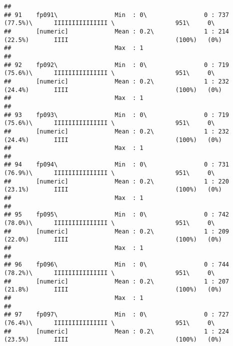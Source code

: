 \documentclass[]{article}
\begin{document}
\begin{verbatim}
## 
## 91    fp091\                Min  : 0\                0 : 737 (77.5%)\      IIIIIIIIIIIIIII \                 951\     0\       
##       [numeric]             Mean : 0.2\              1 : 214 (22.5%)       IIII                              (100%)   (0%)     
##                             Max  : 1                                                                                           
## 
## 92    fp092\                Min  : 0\                0 : 719 (75.6%)\      IIIIIIIIIIIIIII \                 951\     0\       
##       [numeric]             Mean : 0.2\              1 : 232 (24.4%)       IIII                              (100%)   (0%)     
##                             Max  : 1                                                                                           
## 
## 93    fp093\                Min  : 0\                0 : 719 (75.6%)\      IIIIIIIIIIIIIII \                 951\     0\       
##       [numeric]             Mean : 0.2\              1 : 232 (24.4%)       IIII                              (100%)   (0%)     
##                             Max  : 1                                                                                           
## 
## 94    fp094\                Min  : 0\                0 : 731 (76.9%)\      IIIIIIIIIIIIIII \                 951\     0\       
##       [numeric]             Mean : 0.2\              1 : 220 (23.1%)       IIII                              (100%)   (0%)     
##                             Max  : 1                                                                                           
## 
## 95    fp095\                Min  : 0\                0 : 742 (78.0%)\      IIIIIIIIIIIIIII \                 951\     0\       
##       [numeric]             Mean : 0.2\              1 : 209 (22.0%)       IIII                              (100%)   (0%)     
##                             Max  : 1                                                                                           
## 
## 96    fp096\                Min  : 0\                0 : 744 (78.2%)\      IIIIIIIIIIIIIII \                 951\     0\       
##       [numeric]             Mean : 0.2\              1 : 207 (21.8%)       IIII                              (100%)   (0%)     
##                             Max  : 1                                                                                           
## 
## 97    fp097\                Min  : 0\                0 : 727 (76.4%)\      IIIIIIIIIIIIIII \                 951\     0\       
##       [numeric]             Mean : 0.2\              1 : 224 (23.5%)       IIII                              (100%)   (0%)     

\end{verbatim}
\end{document}
